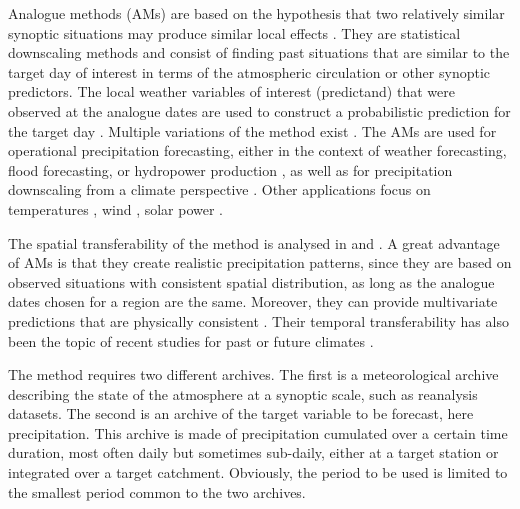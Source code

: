 \documentclass[hess, manuscript]{copernicus}
\begin{document}
	
	
	\introduction  %
	\label{sec:introduction}
	
	Analogue methods (AMs) are based on the hypothesis that two relatively similar synoptic situations may produce similar local effects \citep{Lorenz1956, Lorenz1969}. They are statistical downscaling methods \citep{Maraun2010} and consist of finding past situations that are similar to the target day of interest in terms of the atmospheric circulation or other synoptic predictors. The local weather variables of interest (predictand) that were observed at the analogue dates are used to construct a probabilistic prediction for the target day \citep{Duband1970, Zorita1999}. Multiple variations of the method exist \citep[a non-exhaustive listing can be found in][]{BenDaoud2016}. The AMs are used for operational precipitation forecasting, either in the context of weather forecasting, flood forecasting, or hydropower production \citep[e.g.,][]{Guilbaud1997, Bontron2005, Hamill2006, Desaint2008a, GarciaHernandez2009b, Bliefernicht2010, Marty2010, Marty2012, Horton2012, Obled2014, Hamill2015, BenDaoud2016}, as well as for precipitation downscaling from a climate perspective \citep[e.g.][]{Radanovics2013, Chardon2014, Dayon2015}. Other applications focus on temperatures \citep{Radinovic1975, Woodcock1980, Kruizinga1983, DelleMonache2013, Caillouet2016}, wind \citep{Gordon1987, DelleMonache2013, DelleMonache2011, Vanvyve2015, Alessandrini2015, Junk2015, Junk2015c}, solar power \citep{Alessandrini2015a, Bessa2015}.
	
	The spatial transferability of the method is analysed in \citet{Chardon2014} and \citet{Radanovics2013}. A great advantage of AMs is that they create realistic precipitation patterns, since they are based on observed situations with consistent spatial distribution, as long as the analogue dates chosen for a region are the same. Moreover, they can provide multivariate predictions that are physically consistent \citep{Raynaud2016b}. Their temporal transferability has also been the topic of recent studies for past or future climates \citep{Dayon2015, Caillouet2016}.
	
	The method requires two different archives. The first is a meteorological archive describing the state of the atmosphere at a synoptic scale, such as reanalysis datasets. The second is an archive of the target variable to be forecast, here precipitation. This archive is made of precipitation cumulated over a certain time duration, most often daily but sometimes sub-daily, either at a target station or integrated over a target catchment. Obviously, the period to be used is limited to the smallest period common to the two archives.
	
\end{document}
